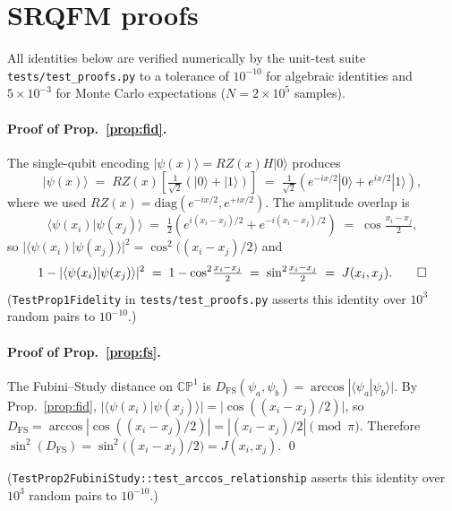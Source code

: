 \documentclass[pdflatex,sn-mathphys]{sn-jnl}
\theoremstyle{plain}
\theoremstyle{remark}
\theoremstyle{definition}
\begin{document}
\appendix

\section{SRQFM proofs}\label{appx:srqfm}
All identities below are verified numerically by the unit-test suite \texttt{tests/test\_proofs.py} to a tolerance of $10^{-10}$ for algebraic identities and $5\times 10^{-3}$ for Monte Carlo expectations ($N=2\times 10^{5}$ samples).

\paragraph{Proof of Prop.~\ref{prop:fid}.}
The single-qubit encoding $|\psi(x)\rangle = RZ(x)H|0\rangle$ produces
\[
|\psi(x)\rangle
\;=\; RZ(x)\!\left[\tfrac{1}{\sqrt2}(|0\rangle + |1\rangle)\right]
\;=\; \tfrac{1}{\sqrt2}\!\left(e^{-ix/2}|0\rangle + e^{ix/2}|1\rangle\right),
\]
where we used $RZ(x) = \mathrm{diag}(e^{-ix/2}, e^{+ix/2})$.
The amplitude overlap is
\[
\langle\psi(x_i)|\psi(x_j)\rangle
\;=\; \tfrac12\!\left(e^{i(x_i-x_j)/2} + e^{-i(x_i-x_j)/2}\right)
\;=\; \cos\!\tfrac{x_i-x_j}{2},
\]
so $|\langle\psi(x_i)|\psi(x_j)\rangle|^2 = \cos^2\!\bigl((x_i-x_j)/2\bigr)$
and
\[
1 - |\langle\psi(x_i)|\psi(x_j)\rangle|^2
\;=\; 1 - \cos^2\!\tfrac{x_i-x_j}{2}
\;=\; \sin^2\!\tfrac{x_i-x_j}{2}
\;=\; J(x_i, x_j). \qed
\]
\noindent (\texttt{TestProp1Fidelity} in \texttt{tests/test\_proofs.py} asserts this identity over $10^{3}$ random pairs to $10^{-10}$.)

\paragraph{Proof of Prop.~\ref{prop:fs}.}
The Fubini--Study distance on $\mathbb{CP}^1$ is $D_{\mathrm{FS}}(\psi_a,\psi_b) = \arccos|\langle\psi_a|\psi_b\rangle|$.
By Prop.~\ref{prop:fid}, $|\langle\psi(x_i)|\psi(x_j)\rangle| = |\cos((x_i-x_j)/2)|$, so $D_{\mathrm{FS}} = \arccos|\cos((x_i-x_j)/2)| = |(x_i-x_j)/2| \pmod{\pi}$.
Therefore $\sin^2(D_{\mathrm{FS}}) = \sin^2\!\bigl((x_i-x_j)/2\bigr) = J(x_i,x_j)$. \qed

\noindent (\texttt{TestProp2FubiniStudy::test\_arccos\_relationship} asserts this identity over $10^{3}$ random pairs to $10^{-10}$.)
\end{document}
